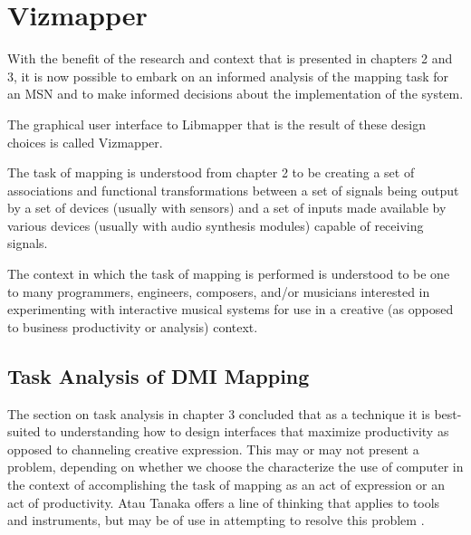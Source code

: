 \resetdatestamp

\chapter{Vizmapper}

With the benefit of the research and context that is presented in chapters 2 and 3, it is now possible to embark on an informed analysis of the mapping task for an MSN and to make informed decisions about the implementation of the system.

The graphical user interface to Libmapper that is the result of these design choices is called Vizmapper.

The task of mapping is understood from chapter 2 to be creating a set of associations and functional transformations between a set of signals being output by a set of devices (usually with sensors) and a set of inputs made available by various devices (usually with audio synthesis modules)  capable of receiving signals.

The context in which the task of mapping is performed is understood to be one to many programmers, engineers, composers, and/or musicians interested in experimenting with interactive musical systems for use in a creative (as opposed to business productivity or analysis) context.

\section{Task Analysis of DMI Mapping}
\begin{comment}
Task analysis and human-computer interaction: approaches, techniques, and levels of analysis - Abe Crystal, Beth Ellington
\end{comment}

The section on task analysis in chapter 3 concluded that as a technique it is best-suited to understanding how to design interfaces that maximize productivity as opposed to channeling creative expression. This may or may not present a problem, depending on whether we choose the characterize the use of computer in the context of accomplishing the task of mapping as an act of expression or an act of productivity. Atau Tanaka offers a line of thinking that applies to tools and instruments, but may be of use in attempting to resolve this problem \cite{tanaka2000}.

